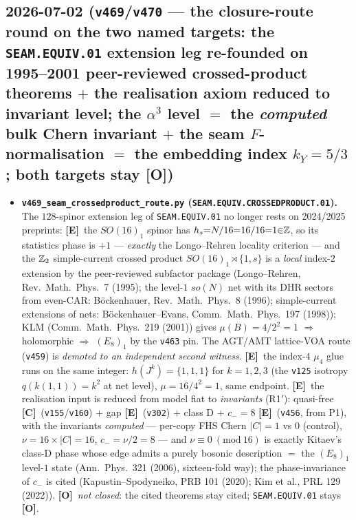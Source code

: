 \documentclass[11pt]{article}
\providecommand{\mE}{\textbf{[E]}}\providecommand{\mC}{\textbf{[C]}}
\providecommand{\mO}{\textbf{[O]}}\providecommand{\mX}{\textbf{[X]}}
\begin{document}
\subsection*{2026-07-02 (\texttt{v469}/\texttt{v470} --- the closure-route round on the two named targets: the \texttt{SEAM.EQUIV.01} extension leg re-founded on 1995--2001 peer-reviewed crossed-product theorems $+$ the realisation axiom reduced to invariant level; the $\alpha^3$ level $=$ the \emph{computed} bulk Chern invariant $+$ the seam $F$-normalisation $=$ the embedding index $k_Y{=}5/3$; both targets stay \mO)}
\begin{itemize}
\item \textbf{\texttt{v469\_seam\_crossedproduct\_route.py} (\texttt{SEAM.EQUIV.CROSSEDPRODUCT.01}).}
The $128$-spinor extension leg of \texttt{SEAM.EQUIV.01} no longer rests on 2024/2025 preprints:
\mE\ the $SO(16)_1$ spinor has $h_s{=}N/16{=}16/16{=}1{\in}\mathbb{Z}$, so its statistics phase is $+1$ ---
\emph{exactly} the Longo--Rehren locality criterion --- and the $\mathbb{Z}_2$ simple-current crossed product
$SO(16)_1{\rtimes}\{1,s\}$ is a \emph{local} index-$2$ extension by the peer-reviewed subfactor package
(Longo--Rehren, Rev.\ Math.\ Phys.\ 7 (1995); the level-$1$ $so(N)$ net with its DHR sectors from
even-CAR: B\"ockenhauer, Rev.\ Math.\ Phys.\ 8 (1996); simple-current extensions of nets:
B\"ockenhauer--Evans, Comm.\ Math.\ Phys.\ 197 (1998)); KLM (Comm.\ Math.\ Phys.\ 219 (2001)) gives
$\mu(B){=}4/2^2{=}1$ $\Rightarrow$ holomorphic $\Rightarrow$ $(E_8)_1$ by the \texttt{v463} pin.
The AGT/AMT lattice-VOA route (\texttt{v459}) is \emph{demoted to an independent second witness}.
\mE\ the index-$4$ $\mu_4$ glue runs on the same integer: $h(J^k){=}\{1,1,1\}$ for $k{=}1,2,3$
(the \texttt{v125} isotropy $q(k(1,1)){=}k^2$ at net level), $\mu{=}16/4^2{=}1$, same endpoint.
\mE\ the realisation input is reduced from model fiat to \emph{invariants} (R1$'$): quasi-free
\mC\ (\texttt{v155}/\texttt{v160}) $+$ gap \mE\ (\texttt{v302}) $+$ class D $+$ $c_-{=}8$ \mE\
(\texttt{v456}, from P1), with the invariants \emph{computed} --- per-copy FHS Chern $|C|{=}1$ vs $0$
(control), $\nu{=}16{\times}|C|{=}16$, $c_-{=}\nu/2{=}8$ --- and $\nu\equiv 0\ (\mathrm{mod}\ 16)$ is
exactly Kitaev's class-D phase whose edge admits a purely bosonic description $=$ the $(E_8)_1$
level-$1$ state (Ann.\ Phys.\ 321 (2006), sixteen-fold way); the phase-invariance of $c_-$ is cited
(Kapustin--Spodyneiko, PRB 101 (2020); Kim et al., PRL 129 (2022)). \mO\ \emph{not closed}: the cited
theorems stay cited; \texttt{SEAM.EQUIV.01} stays \mO.

\end{itemize}
\end{document}
